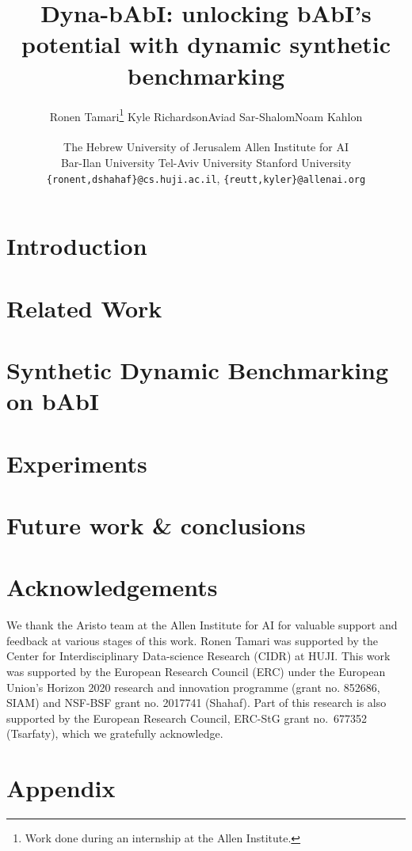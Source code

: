 \documentclass[11pt]{article}
\title{Dyna-bAbI: unlocking bAbI's potential with dynamic synthetic benchmarking}
\author{Ronen Tamari\affa\thanks{Work done during an internship at the Allen Institute.} \tab Kyle Richardson\affc \tab Aviad Sar-Shalom\affd \tab Noam Kahlon\affa \\ \quad {\bf Nelson F. Liu}\affe \tab  {\bf Reut Tsarfaty}\affc\affb \tab {\bf Dafna Shahaf}\affa \\
  \affa The Hebrew University of Jerusalem  \tab \affc Allen Institute for AI \\
   \tab \affb Bar-Ilan University \tab \affd Tel-Aviv University \tab \affe Stanford University \\
  \texttt{\{ronent,dshahaf\}@cs.huji.ac.il},  \texttt{\{reutt,kyler\}@allenai.org} %
}
\begin{document}
\maketitle
\begin{abstract}

\end{abstract}

\section{Introduction}


\section{Related Work}
\label{sec:related}


\section{Synthetic Dynamic Benchmarking on bAbI}

\label{sec:sdb_babi}


\section{Experiments}
\label{sec:experiments}


\section{Future work \& conclusions}
\label{sec:fw_conclusions}



\section*{Acknowledgements}
We thank the Aristo team at the Allen Institute for AI for valuable support and feedback at various stages of this work. Ronen Tamari was supported by the Center for Interdisciplinary Data-science Research (CIDR) at HUJI. This work was supported by the European Research Council (ERC) under the European Union's Horizon 2020 research and innovation programme (grant no. 852686, SIAM) and NSF-BSF grant no. 2017741 (Shahaf). Part of this research is also supported by   the European Research Council, ERC-StG grant no.\ 677352 (Tsarfaty), which we gratefully acknowledge.  




\clearpage
\newpage


\appendix

\section{Appendix}
\label{sec:appendix}

\end{document}
